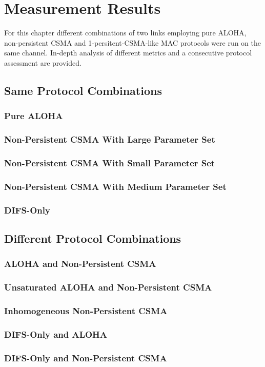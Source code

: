 \chapter{Measurement Results}

For this chapter different combinations of two links employing pure ALOHA, non-persistent CSMA and 1-persitent-CSMA-like MAC protocols were run on the same channel. In-depth analysis of different metrics and a consecutive protocol assessment are provided. 

\section{Same Protocol Combinations}

\subsection{Pure ALOHA}

\subsection{Non-Persistent CSMA With Large Parameter Set}

\subsection{Non-Persistent CSMA With Small Parameter Set}

\subsection{Non-Persistent CSMA With Medium Parameter Set}

\subsection{DIFS-Only}

\section{Different Protocol Combinations}

\subsection{ALOHA and Non-Persistent CSMA}

\subsection{Unsaturated ALOHA and Non-Persistent CSMA}

\subsection{Inhomogeneous Non-Persistent CSMA }

\subsection{DIFS-Only and ALOHA}

\subsection{DIFS-Only and Non-Persistent CSMA}